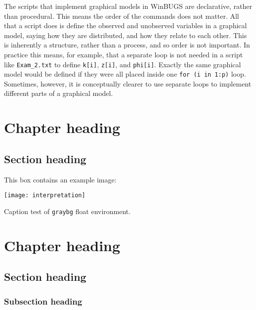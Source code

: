 \documentclass{bayeshyp}
\begin{document}
\lipsum

\begin{graybg}
  The scripts that implement graphical models in WinBUGS are declarative,
  rather than procedural. This means the order of the commands does not matter.
  All that a script does is define the observed and unobserved variables in a
  graphical model, saying how they are distributed, and how they relate to each
  other. This is inherently a structure, rather than a process, and so order is
  not important. In practice this means, for example, that a separate loop is
  not needed in a script like \texttt{Exam\_2.txt} to define \texttt{k[i]},
  \texttt{z[i]}, and \texttt{phi[i]}. Exactly the same graphical model would be
  defined if they were all placed inside one \texttt{for (i in 1:p)} loop.
  Sometimes, however, it is conceptually clearer to use separate loops to
  implement different parts of a graphical
  model.\label{scriptsforgraphicalmodels}
\end{graybg}

\lipsum

\chapter{Chapter heading}
\blindtext
\section{Section heading}%
\blindtext

\begin{graybg}
  This box contains an example image:

  \begin{center}
    \texttt{[image: interpretation]}
  \end{center}
  \caption{Caption test of \texttt{graybg} float environment.}
\end{graybg}

\chapter[byline={with Kevin}]{Chapter heading}
\section{Section heading}
\subsection{Subsection heading}
\end{document}
